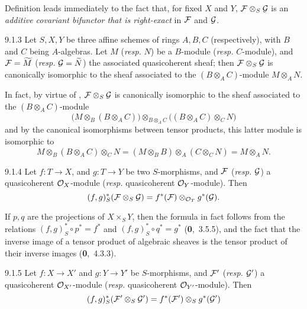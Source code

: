 Definition  leads immediately to the fact that, for fixed $X$ and
$Y$, $\mathcal{F}\otimes_S\mathcal{G}$ is an \emph{additive covariant bifunctor that
is right-exact} in $\mathcal{F}$ and $\mathcal{G}$.

\begin{env}[Proposition]{9.1.3}
Let $S,X,Y$ be three affine schemes of rings
$A,B,C$ (respectively), with $B$ and $C$ being $A$-algebras. Let $M$
(\emph{resp.} $N$) be a $B$-module (\emph{resp.} $C$-module), and
$\mathcal{F}=\widetilde{M}$ (\emph{resp.} $\mathcal{G}=\widetilde{N}$) the
associated quasicoherent sheaf; then $\mathcal{F}\otimes_S\mathcal{G}$ is
canonically isomorphic to the sheaf associated to the $(B\otimes_A C)$-module
$M\otimes_A N$.
\end{env}

In fact, by virtue of , $\mathcal{F}\otimes_S\mathcal{G}$
is canonically isomorphic to the sheaf associated to the $(B\otimes_A C)$-module
\[
  \big(M\otimes_B(B\otimes_A C)\big)\otimes_{B\otimes_A C}\big((B\otimes_A C)\otimes_C N\big)
\]
and by the canonical isomorphisms between tensor
products, this latter module is isomorphic to
\[
  M\otimes_B(B\otimes_A C)\otimes_C N=(M\otimes_B B)\otimes_A(C\otimes_C N)=M\otimes_A N.
\]

\begin{env}[Proposition]{9.1.4}
Let $f\colon T\to X$, and $g\colon T\to Y$ be
two $S$-morphisms, and $\mathcal{F}$ (\emph{resp.} $\mathcal{G}$) a quasicoherent
$\mathcal{O}_X$-module (\emph{resp.} quasicoherent $\mathcal{O}_Y$-module). Then
\[
  (f,g)^\ast_S(\mathcal{F}\otimes_S\mathcal{G})=f^\ast(\mathcal{F})\otimes_{\mathcal{O}_T}g^\ast(\mathcal{G}).
\]
\end{env}

If $p,q$ are the projections of $X\times_S Y$, then the formula in fact follows
from the relations $(f,g)^\ast_S\circ p^\ast=f^\ast$ and
$(f,g)^\ast_S\circ q^\ast=g^\ast$ (\textbf{0},~3.5.5), and the fact that the inverse
image of a tensor product of algebraic sheaves is the tensor product of their inverse
images (\textbf{0},~4.3.3).

\begin{env}[Corollary]{9.1.5}
Let $f\colon X\to X'$ and $g\colon Y\to Y'$ be
$S$-morphisms, and $\mathcal{F}'$ (\emph{resp.} $\mathcal{G}'$) a quasicoherent
$\mathcal{O}_{X'}$-module (\emph{resp.} quasicoherent $\mathcal{O}_{Y'}$-module). Then
\[
  (f,g)^\ast_S(\mathcal{F}'\otimes_S\mathcal{G}')
  =f^\ast(\mathcal{F}')\otimes_S g^\ast(\mathcal{G}')
\]
\end{env}

